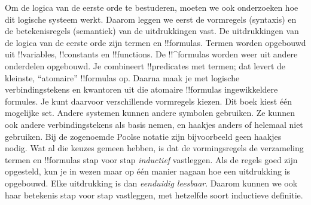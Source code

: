 \documentclass[../../../include/open-logic-section]{subfiles}
\begin{document}


Om de logica van de eerste orde te bestuderen, moeten we ook
onderzoeken hoe dit logische systeem werkt. Daarom leggen we eerst de
vormregels (syntaxis) en de betekenisregels (semantiek) van de
uitdrukkingen vast. De uitdrukkingen van de logica van de eerste orde
zijn termen en !!{formula}s. Termen worden opgebouwd uit
!!{variable}s, !!{constant}s en !!{function}s.
De !!^{formula}s worden weer uit andere onderdelen opgebouwd. Je
combineert !!{predicate}s met termen; dat levert de kleinste,
``atomaire'' !!{formula}s op. Daarna maak je met logische
verbindingstekens en kwantoren uit die atomaire !!{formula}s
ingewikkeldere formules.
Je kunt daarvoor verschillende vormregels kiezen. Dit boek kiest één
mogelijke set. Andere systemen kunnen andere symbolen gebruiken. Ze
kunnen ook andere verbindingstekens als basis nemen, en haakjes anders
of helemaal niet gebruiken. Bij de zogenoemde Poolse notatie zijn
bijvoorbeeld geen haakjes nodig.
Wat al die keuzes gemeen hebben, is dat de vormingsregels de
verzameling termen en !!{formula}s stap voor stap \emph{inductief}
vastleggen. Als de regels goed zijn opgesteld, kun je in wezen maar op
één manier nagaan hoe een uitdrukking is opgebouwd. Elke uitdrukking is
dan \emph{eenduidig leesbaar}. Daarom kunnen we ook haar betekenis stap
voor stap vastleggen, met hetzelfde soort inductieve definitie.
\end{document}
